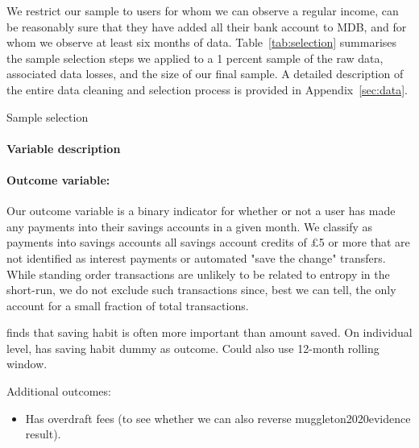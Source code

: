 We restrict our sample to users for whom we can observe a regular income, can
be reasonably sure that they have added all their bank account to MDB, and for
whom we observe at least six months of data. Table~\ref{tab:selection}
summarises the sample selection steps we applied to a 1 percent sample of the
raw data, associated data losses, and the size of our final sample. A detailed
description of the entire data cleaning and selection process is provided in
Appendix~\ref{sec:data}.

\begin{table}[H]
\caption{Sample selection}\label{tab:selection}

\end{table}

\paragraph{Variable description}%
\label{par:dependent_variable}

\paragraph{Outcome variable:}%
\label{par:outcome_variable_}
Our outcome variable is a binary indicator for whether or not a user has made
any payments into their savings accounts in a given month. We classify as
payments into savings accounts all savings account credits of \pounds5 or more
that are not identified as interest payments or automated "save the change"
transfers. While standing order transactions are unlikely to be related to
entropy in the short-run, we do not exclude such transactions since, best we
can tell, the only account for a small fraction of total transactions.


\citet{mps2018building} finds that saving habit is often more important than
amount saved. On individual level, has saving habit dummy as outcome. Could
also use 12-month rolling window.

Additional outcomes:
\begin{itemize}
    \item Has overdraft fees (to see whether we can also reverse
        muggleton2020evidence result).
\end{itemize}

